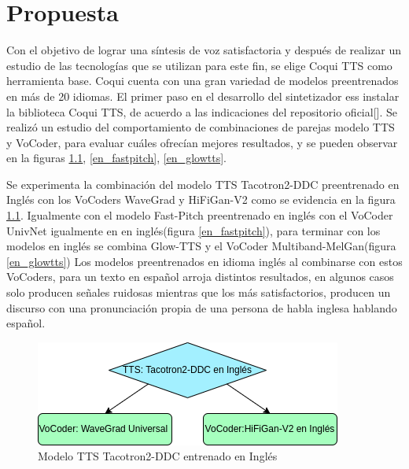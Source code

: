 \chapter{Propuesta}\label{chapter:proposal}

Con el objetivo de lograr una síntesis de voz satisfactoria y después de realizar un estudio de las tecnologías que se utilizan para este fin, se elige Coqui TTS como herramienta base. Coqui cuenta con una gran variedad de modelos preentrenados en más de 20 idiomas.  
El primer paso en el desarrollo del sintetizador ess instalar la biblioteca Coqui TTS, de acuerdo a las indicaciones del repositorio oficial[\cite{coqui-doc}]. Se realizó un estudio del comportamiento de combinaciones de parejas modelo TTS y VoCoder, para evaluar cuáles ofrecían mejores resultados, y se pueden observar en la figuras \ref{en_tacotron2}, \ref{en_fastpitch}, \ref{en_glowtts}.

Se experimenta la combinación del modelo TTS Tacotron2-DDC preentrenado en Inglés con los VoCoders WaveGrad y HiFiGan-V2 como se evidencia en la figura \ref{en_tacotron2}. Igualmente con el modelo Fast-Pitch preentrenado en inglés con el VoCoder UnivNet igualmente en  en inglés(figura \ref{en_fastpitch}), para terminar con los modelos en inglés se combina Glow-TTS y el VoCoder Multiband-MelGan(figura \ref{en_glowtts})
Los modelos preentrenados en idioma inglés al combinarse con estos VoCoders, para un texto en español arroja distintos resultados, en algunos casos solo producen señales ruidosas mientras que los más satisfactorios, producen un discurso con una pronunciación propia de una persona de habla inglesa hablando español.

\begin{figure}[H]
	\centering
	\includegraphics[width=0.6\linewidth]{Graphics/en_tacotron2}
	\caption{Modelo TTS Tacotron2-DDC entrenado en Inglés}
	\label{en_tacotron2}
\end{figure}

